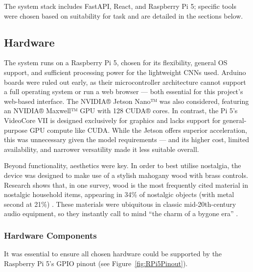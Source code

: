                 The system stack includes FastAPI, React, and Raspberry Pi 5; specific tools were chosen based on suitability for task and are detailed in the sections below.
    
    
        \subsection{Hardware}
    
            The system runs on a Raspberry Pi 5, chosen for its flexibility, general OS support, and sufficient processing power for the lightweight CNNs used. Arduino boards were ruled out early, as their microcontroller architecture cannot support a full operating system or run a web browser — both essential for this project’s web-based interface. The NVIDIA® Jetson Nano™ was also considered, featuring an NVIDIA® Maxwell™ GPU with 128 CUDA® cores. In contrast, the Pi 5’s VideoCore VII is designed exclusively for graphics and lacks support for general-purpose GPU compute like CUDA. While the Jetson offers superior acceleration, this was unnecessary given the model requirements — and its higher cost, limited availability, and narrower versatility made it less suitable overall.
            
            Beyond functionality, aesthetics were key. In order to best utilise nostalgia, the device was designed to make use of a stylish mahogany wood with brass controls. Research shows that, in one survey, wood is the most frequently cited material in nostalgic household items, appearing in 34\% of nostalgic objects (with metal second at 21\%) \cite{Skinner2022}. These materials were ubiquitous in classic mid-20th-century audio equipment, so they instantly call to mind ``the charm of a bygone era'' \cite{LookInTheAttic2024}.
    
            \subsubsection{Hardware Components}
    
                It was essential to ensure all chosen hardware could be supported by the Raspberry Pi 5's GPIO pinout (see Figure~\ref{fig:RPi5Pinout}).
    
